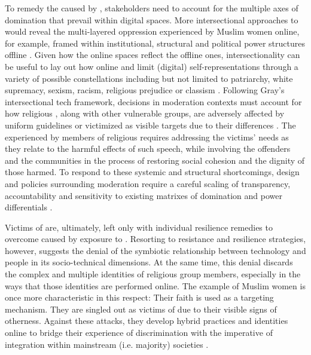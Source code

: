 \documentclass[output=paper,colorlinks,citecolor=brown]{langscibook}
\begin{document}
To remedy the  caused by , stakeholders need to account for the multiple axes of domination that prevail within digital spaces. More intersectional approaches to  would reveal the multi-layered oppression experienced by Muslim women online, for example, framed within institutional, structural and political power structures offline \citep{bivens2017,bowleg2008,christian_day_diaz_peterson-salahuddin2020,macmillan_cottom2020}. Given how the online spaces reflect the offline ones, intersectionality can be useful to lay out how online  and  limit  (digital) self-representations through a variety of possible constellations including but not limited to patriarchy, white supremacy, sexism, racism, religious prejudice or classism \citep[44-45]{topidi_metcalfe2024}. Following Gray's intersectional tech framework, decisions in moderation contexts must account for how religious , along with other vulnerable groups, are adversely affected by uniform guidelines or victimized as visible targets due to their differences \citep[6]{gilbert2023}. The  experienced by members of religious  requires addressing the victims' needs as they relate to the harmful effects of such speech, while involving the offenders and the communities in the process of restoring social cohesion and the dignity of those harmed. To respond to these systemic and structural shortcomings, design and policies surrounding  moderation require a careful scaling of transparency, accountability and sensitivity to existing matrixes of domination and power differentials \citep{hill-collins1990}.

Victims of  are, ultimately, left only with individual resilience remedies to overcome  caused by exposure to . Resorting to resistance and resilience strategies, however, suggests the denial of the symbiotic relationship between technology and people in its socio-technical dimensions. At the same time, this denial discards the complex and multiple identities of religious  group members, especially in the ways that those identities are performed online. The example of Muslim  women is once more characteristic in this respect: Their faith is used as a targeting mechanism. They are singled out as victims of  due to their visible signs of otherness. Against these attacks, they develop hybrid practices and identities online to bridge their experience of discrimination with the imperative of integration within mainstream (i.e. majority) societies \citep[65]{mahmudova_evolvi2021}.  
\end{document}
